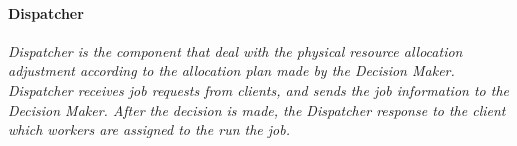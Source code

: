 \paragraph{Dispatcher}	%

\em{Dispatcher} is the component that deal with the physical resource
allocation adjustment according to the allocation plan made by the
\em{Decision Maker}.
\em{Dispatcher} receives job requests from clients, and sends the job
information to the \em{Decision Maker}.
After the decision is made, the \em{Dispatcher} response to the client
which \em{workers} are assigned to the run the \em{job}.



%  




